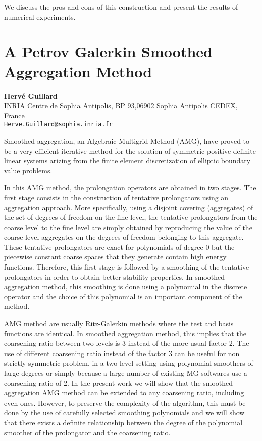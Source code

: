 \documentclass[11pt]{article}
\newcommand{\nextab}[4]{
	\section{#2}
	{\bf #1} \\ \nopagebreak
	{#3} \\ \nopagebreak
	{\tt #4} \nopagebreak
	}
\begin{document}
We discuss the pros and cons of this construction and present the results of numerical
experiments.


\nextab{Herv\'e Guillard}
	{A Petrov Galerkin Smoothed Aggregation Method}
	{INRIA Centre de Sophia Antipolis,
		BP 93,06902 Sophia Antipolis CEDEX, France}
	{Herve.Guillard@sophia.inria.fr}

Smoothed aggregation, an Algebraic Multigrid Method (AMG),
have proved to be a very efficient iterative method for
the solution of symmetric positive definite linear systems arizing
from the finite element discretization of elliptic boundary value
problems.

In this AMG method, the prolongation operators are obtained in two
stages.
The first stage consists in the
construction of tentative prolongators using an aggregation
approach. More specifically, using a disjoint covering (aggregates)
of the set of
degrees of freedom on the fine level, the tentative prolongators from
the coarse level to the fine level
are simply obtained by reproducing the value
of the coarse level aggregates on the degrees of freedom belonging to
this aggregate. These tentative prolongators are exact for polynomials
of degree 0
but the piecewise constant coarse spaces that they generate
contain high energy functions. Therefore, this first
stage is followed by a smoothing of the tentative prolongators in
order to obtain better stability properties. In smoothed aggregation method,
this smoothing is done using a polynomial in the discrete operator and
the choice of this polynomial is an important component of the method.

AMG method are usually Ritz-Galerkin methods where the test and basis
functions are identical. In smoothed aggregation method, this implies that the
coarsening ratio between two levels is 3 instead of the more usual factor 2.
The use of different coarsening
ratio instead of the factor 3 can be useful
for non strictly symmetric problem, in a two-level setting using
polynomial smoothers of large degrees or simply because a large number
of existing MG softwares use a coarsening ratio of 2. In the present work
we will show that the smoothed aggregation
AMG method can be extended to any coarsening ratio, including even
ones. However, to preserve the complexity of the algorithm, this must be done
by the use of carefully selected smoothing
polynomials and we will show that there exists a definite relationship
between the degree of the polynomial smoother of the prolongator and the
coarsening ratio.
\end{document}
